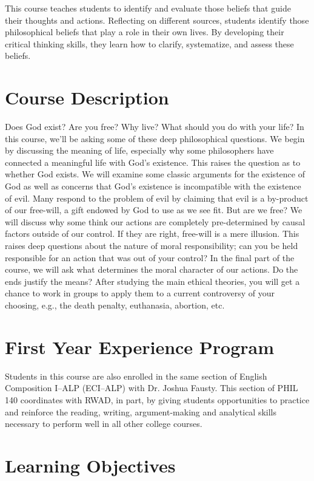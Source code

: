 \documentclass[11pt,article,oneside]{memoir}
\begin{document}
This course teaches students to identify and evaluate those beliefs that guide their thoughts and actions. Reflecting on different sources, students identify those philosophical beliefs that play a role in their own lives. By developing their critical thinking skills, they learn how to clarify, systematize, and assess these beliefs. 

\section{Course Description}

Does God exist? Are you free? Why live? What should you do with your life?  In this
course, we'll be asking some of these deep philosophical questions. We begin by discussing the meaning of life, especially why some philosophers have connected a meaningful life with God's existence. This raises the question as to whether God exists. We will examine some classic arguments for the existence of God as well as concerns that God's existence is incompatible with the existence of evil. Many respond to the problem of evil by claiming that evil is a by-product of our free-will, a gift endowed by God to use as we see fit. But are we free? We will discuss why some think our actions are completely pre-determined by causal factors outside of our control. If they are right, free-will is a mere illusion. This raises deep questions about the nature of moral responsibility; can you be held responsible for an action that was out of your control? In the final part of the course, we will ask what determines the moral character of our actions. Do the ends justify the means? After studying the main ethical theories, you will get a chance to work in groups to apply them to a current controversy of your choosing, e.g., the death penalty, euthanasia, abortion, etc.  

 \section{First Year Experience Program}
Students in this course are also enrolled in the same section of English Composition I--ALP (ECI--ALP) with Dr. Joshua Fausty.  This section of PHIL 140 coordinates with RWAD, in part, by giving students opportunities to practice and reinforce the reading, writing, argument-making and analytical skills necessary to perform well in all other college courses. 



\section{Learning Objectives}
\end{document}
